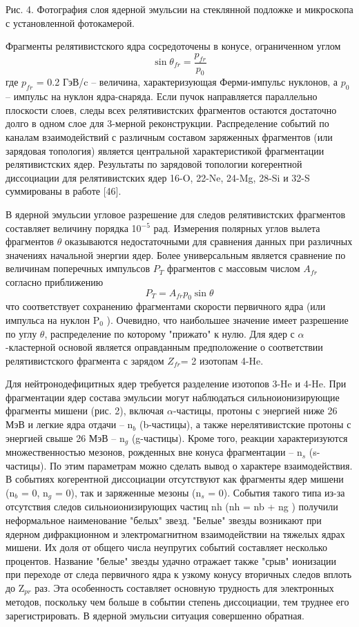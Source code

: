 \documentclass[fontsize=14pt]{scrarticle}
\begin{document}
Рис. 4. Фотография слоя ядерной эмульсии на стеклянной подложке и микроскопа с установленной фотокамерой.

Фрагменты релятивистского ядра сосредоточены в конусе, ограниченном углом
\begin{equation}
    \sin\theta_{fr}=\frac{p_{fr}}{p_{0}}
    \label{1}
\end{equation}
где $p_{fr}$ = 0.2 ГэВ/c – величина, характеризующая Ферми-импульс нуклонов, а $p_{0}$ – импульс на нуклон ядра-снаряда. Если пучок направляется параллельно плоскости слоев, следы всех релятивистских фрагментов остаются достаточно долго в одном слое для 3-мерной реконструкции. Распределение событий по каналам взаимодействий с различным составом заряженных фрагментов (или зарядовая топология) является центральной характеристикой фрагментации релятивистских ядер. Результаты по зарядовой топологии когерентной диссоциации для релятивистских ядер 16-O, 22-Ne, 24-Mg, 28-Si и 32-S суммированы в работе [46].

В ядерной эмульсии угловое разрешение для следов релятивистских фрагментов составляет величину порядка 10$^{-5}$ рад. Измерения полярных углов вылета фрагментов $\theta$ оказываются недостаточными для сравнения данных при различных значениях начальной энергии ядер. Более универсальным является сравнение по величинам поперечных импульсов $P_{T}$ фрагментов с массовым числом $A_{fr}$ согласно приближению
\begin{equation}
    P_{T}=A_{fr}p_{0}\sin\theta
    \label{2}
\end{equation}
что соответствует сохранению фрагментами скорости первичного ядра (или импульса на нуклон P$_{0}$ ). Очевидно, что наибольшее значение имеет разрешение по углу $\theta$, распределение по которому "прижато" к нулю. Для ядер с $\alpha$-кластерной основой является оправданным предположение о соответствии релятивистского фрагмента с зарядом $Z_{fr}$= 2 изотопам 4-He.

Для нейтронодефицитных ядер требуется разделение изотопов 3-He и 4-He. При фрагментации ядер состава эмульсии могут наблюдаться сильноионизирующие фрагменты мишени (рис. 2), включая $\alpha$-частицы, протоны с энергией ниже 26 МэВ и легкие ядра отдачи – n$_{b}$ (b-частицы), а также нерелятивистские протоны с энергией свыше 26 МэВ – n$_{g}$ (g-частицы). Кроме того, реакции характеризуются множественностью мезонов, рожденных вне конуса фрагментации – n$_{s}$ (s-частицы). По этим параметрам можно сделать вывод о характере взаимодействия. В событиях когерентной диссоциации отсутствуют как фрагменты ядер мишени (n$_{b}$ = 0, n$_{g}$ = 0), так и заряженные мезоны (n$_{s}$ = 0). События такого типа из-за отсутствия следов сильноионизирующих частиц nh (nh = nb + ng ) получили неформальное наименование "белых" звезд. "Белые" звезды возникают при ядерном дифракционном и электромагнитном взаимодействии на тяжелых ядрах мишени. Их доля от общего числа неупругих событий составляет несколько процентов. Название "белые" звезды удачно отражает также "срыв" ионизации при переходе от следа первичного ядра к узкому конусу вторичных следов вплоть до Z$_{pr}$ раз. Эта особенность составляет основную трудность для электронных методов, поскольку чем больше в событии степень диссоциации, тем труднее его зарегистрировать. В ядерной эмульсии ситуация совершенно обратная. 	
\end{document}

